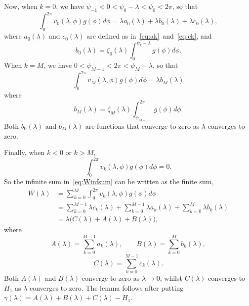 \documentclass[journal]{IEEEtran}
\begin{document}
\begin{IEEEproof}
Now, when $k = 0$, we have $\psi_{-1} < 0 < \psi_0 - \lambda < \psi_0 < 2\pi$, so that
\[
\int_0^{2\pi} v_0(\lambda, \phi) g(\phi) d\phi = \lambda a_0(\lambda) + \lambda b_0(\lambda) +  \lambda c_0(\lambda),
\]
where $a_0(\lambda)$ and $c_0(\lambda)$ are defined as in~\eqref{eq:ak}~and~\eqref{eq:ck}, and
\[
b_0(\lambda) = \zeta_0(\lambda) \int_{0}^{\psi_k-\lambda} g(\phi) d\phi.
\]
When $k = M$, we have $0 < \psi_{M-1} < 2\pi < \psi_{M} - \lambda$, so that
\[
\int_0^{2\pi} v_{M}(\lambda, \phi) g(\phi) d\phi = \lambda b_{M}(\lambda)
\]
where 
\[
b_{M}(\lambda) = \zeta_{M}(\lambda) \int_{\psi_{M-1}}^{2\pi}g(\phi) d\phi.
\]
Both $b_0(\lambda)$ and $b_M(\lambda)$ are functions that converge to zero as $\lambda$ converges to zero.
 
Finally, when $k < 0$ or $k > M$, 
\[
\int_0^{2\pi} v_k(\lambda, \phi) g(\phi) d\phi = 0.
\]
So the infinite sum in~\eqref{eq:Winfsum} can be written as the finite sum,
\begin{align*}
W(\lambda) &= \sum_{k=0}^{M} \int_{0}^{2\pi} v_k(\lambda, \phi) g(\phi) d\phi \\
&= \sum_{k=0}^{M-1} \lambda c_k(\lambda) + \sum_{k=0}^{M-1} \lambda a_k(\lambda) + \sum_{k=0}^{M} \lambda b_k(\lambda) \\
&= \lambda \big( C(\lambda)  + A(\lambda) + B(\lambda) \big),
\end{align*}
where 
\[
A(\lambda) = \sum_{k=0}^{M-1} a_k(\lambda), \qquad B(\lambda) = \sum_{k=0}^{M} b_k(\lambda),  
\]
\[
C(\lambda) = \sum_{k=0}^{M-1} c_k(\lambda).
\]
Both $A(\lambda)$ and $B(\lambda)$ converge to zero as $\lambda \rightarrow 0$, whilst $C(\lambda)$ converges to $H_1$ as $\lambda$ converges to zero.  The lemma follows after putting $\gamma(\lambda) = A(\lambda) + B(\lambda) + C(\lambda) - H_1$.
\end{IEEEproof}
\end{document}
